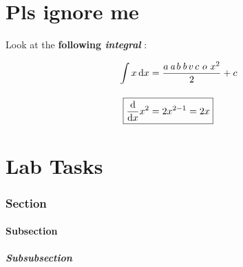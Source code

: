 \documentclass[12pt]{article}
\begin{document}
\newpage
{}
\part*{Pls ignore me} \label{pls ignore me}

Look at the \textbf{following \textit{integral}} : 

\begin{align*}
    \int x \, \text{d}x &= \frac{ a \, \textit{a} \, b \, \textit{b} \, v\, c \ o \ x^2}{2} + c \\
    \intertext{}
    \Aboxed{\frac{\text{d}}{\text{d}x} x^2 &= 2 x^{2 - 1} = 2x} \\
\end{align*}


\newpage
{}
\part*{Lab Tasks}



\newpage
{}
\section*{Section}


\subsection*{Subsection}

\subsubsection*{Subsubsection}
\end{document}
